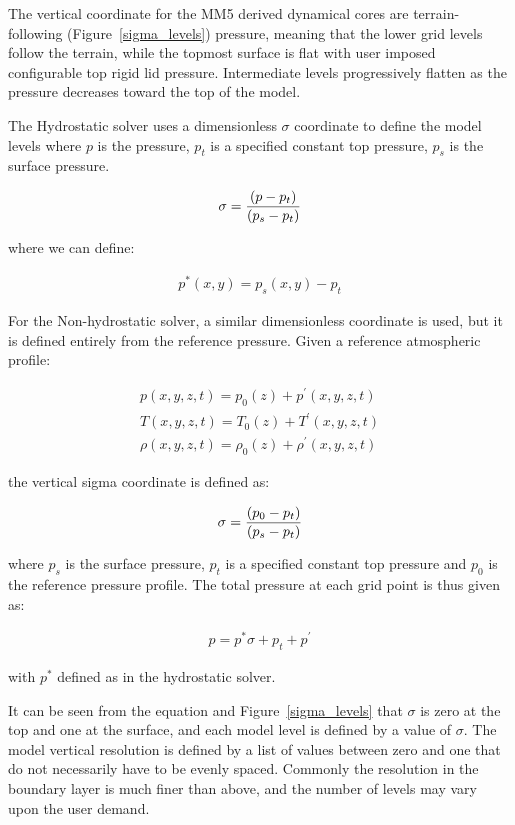 The vertical coordinate for the \ac{MM5} derived dynamical cores are
terrain-following (Figure~\ref{sigma_levels}) pressure, meaning
that the lower grid levels follow the terrain, while the topmost surface is
flat with user imposed configurable top rigid lid pressure.
Intermediate levels progressively flatten as the pressure decreases
toward the top of the model. 

The Hydrostatic solver uses a dimensionless $\sigma$ coordinate to
define the model levels where $p$ is the pressure, $p_t$ is a specified
constant top pressure, $p_s$ is the surface pressure.

\begin{eqnarray}
  \sigma = {(p - p_t) \over (p_s - p_t)}
\end{eqnarray}

where we can define:

\begin{eqnarray}
  p^*(x,y) = p_s(x,y) - p_t
\end{eqnarray}

For the Non-hydrostatic solver, a similar dimensionless coordinate is used,
but it is defined entirely from the reference pressure. Given a reference
atmospheric profile:

\begin{eqnarray}
  p(x,y,z,t) = p_0(z) + p^\prime(x,y,z,t) \\
  T(x,y,z,t) = T_0(z) + T^\prime(x,y,z,t) \\
  \rho(x,y,z,t) = \rho_0(z) + \rho^\prime(x,y,z,t)
\end{eqnarray}

the vertical sigma coordinate is defined as:

\begin{eqnarray}
  \sigma = {(p_0 - p_t) \over (p_s - p_t)}
\end{eqnarray}

where $p_s$ is the surface pressure, $p_t$ is a specified constant top
pressure and $p_0$ is the reference pressure profile. The total pressure
at each grid point is thus given as:

\begin{eqnarray}
 p = p^*\sigma + p_t + p^\prime
\end{eqnarray}

with $p^*$ defined as in the hydrostatic solver.

It can be seen from the equation and Figure~\ref{sigma_levels} that $\sigma$ is
zero at the top and one at the surface, and each model level is defined by a
value of $\sigma$. The model vertical resolution is defined by a list of values
between zero and one that do not necessarily have to be evenly spaced. Commonly
the resolution in the boundary layer is much finer than above, and the number of
levels may vary upon the user demand.

